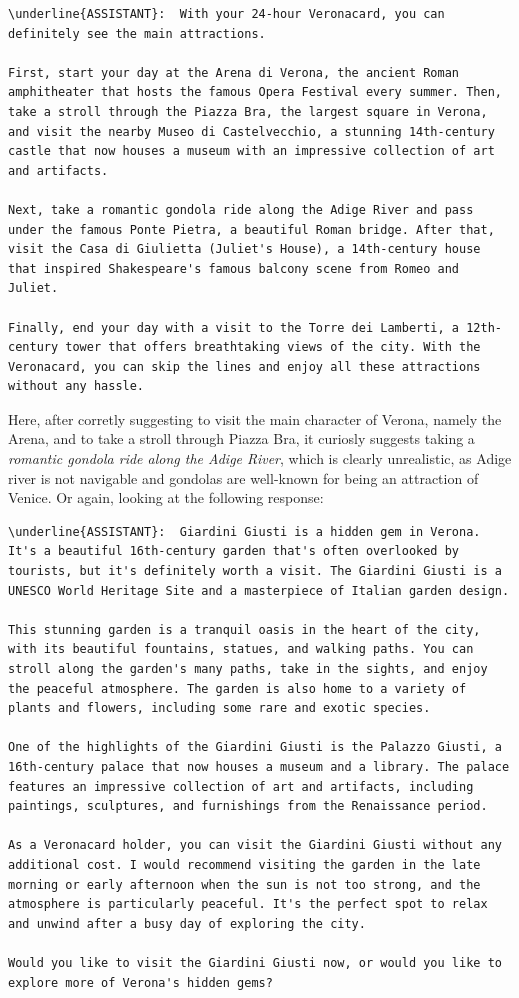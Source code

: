 \begin{Verbatim}[breaklines=true]
\underline{ASSISTANT}:  With your 24-hour Veronacard, you can definitely see the main attractions. 

First, start your day at the Arena di Verona, the ancient Roman amphitheater that hosts the famous Opera Festival every summer. Then, take a stroll through the Piazza Bra, the largest square in Verona, and visit the nearby Museo di Castelvecchio, a stunning 14th-century castle that now houses a museum with an impressive collection of art and artifacts.

Next, take a romantic gondola ride along the Adige River and pass under the famous Ponte Pietra, a beautiful Roman bridge. After that, visit the Casa di Giulietta (Juliet's House), a 14th-century house that inspired Shakespeare's famous balcony scene from Romeo and Juliet.

Finally, end your day with a visit to the Torre dei Lamberti, a 12th-century tower that offers breathtaking views of the city. With the Veronacard, you can skip the lines and enjoy all these attractions without any hassle.
\end{Verbatim}

Here, after corretly suggesting to visit the main character of Verona, namely the Arena, and to take a stroll through Piazza Bra, it curiosly suggests taking a \textit{romantic gondola ride along the Adige River}, which is clearly unrealistic, as Adige river is not navigable and gondolas are well-known for being an attraction of Venice. Or again, looking at the following response:

\begin{Verbatim}[breaklines=true]
\underline{ASSISTANT}:  Giardini Giusti is a hidden gem in Verona. It's a beautiful 16th-century garden that's often overlooked by tourists, but it's definitely worth a visit. The Giardini Giusti is a UNESCO World Heritage Site and a masterpiece of Italian garden design.

This stunning garden is a tranquil oasis in the heart of the city, with its beautiful fountains, statues, and walking paths. You can stroll along the garden's many paths, take in the sights, and enjoy the peaceful atmosphere. The garden is also home to a variety of plants and flowers, including some rare and exotic species.

One of the highlights of the Giardini Giusti is the Palazzo Giusti, a 16th-century palace that now houses a museum and a library. The palace features an impressive collection of art and artifacts, including paintings, sculptures, and furnishings from the Renaissance period.

As a Veronacard holder, you can visit the Giardini Giusti without any additional cost. I would recommend visiting the garden in the late morning or early afternoon when the sun is not too strong, and the atmosphere is particularly peaceful. It's the perfect spot to relax and unwind after a busy day of exploring the city.

Would you like to visit the Giardini Giusti now, or would you like to explore more of Verona's hidden gems?
\end{Verbatim}

